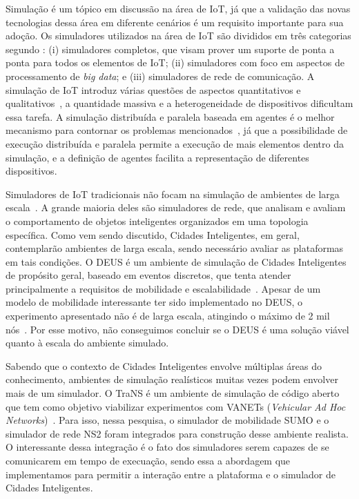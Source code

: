 Simulação é um tópico em discussão na área de IoT, já que a validação das novas tecnologias dessa área em diferente cenários é um requisito importante para sua adoção.
Os simuladores utilizados na área de IoT são divididos em três categorias segundo \cite{baig_2018}:
(i) simuladores completos, que visam prover um suporte de ponta a ponta para todos os elementos de IoT;
(ii) simuladores com foco em aspectos de processamento de \textit{big data};
e (iii) simuladores de rede de comunicação.
A simulação de IoT introduz várias questões de aspectos quantitativos e qualitativos~\citep{angelo_2016}, a quantidade massiva e a heterogeneidade de dispositivos dificultam essa tarefa.
A simulação distribuída e paralela baseada em agentes é o melhor mecanismo para contornar os problemas mencionados~\citep{angelo_2016}, já que a possibilidade de execução distribuída e paralela permite
a execução de mais elementos dentro da simulação, e a definição de agentes facilita a representação de diferentes dispositivos.

Simuladores de IoT tradicionais não focam na simulação de ambientes de larga escala~\citep{brambilla_2014}.
A grande maioria deles são simuladores de rede, que analisam e avaliam o comportamento de objetos inteligentes organizados em uma topologia específica.
Como vem sendo discutido, Cidades Inteligentes, em geral, contemplarão ambientes de larga escala, sendo necessário avaliar as plataformas em tais condições.
O DEUS é um ambiente de simulação de Cidades Inteligentes de propósito geral, baseado em eventos discretos, que tenta atender principalmente a requisitos de mobilidade e escalabilidade~\citep{picone_2012}.
Apesar de um modelo de mobilidade interessante ter sido implementado no DEUS, o experimento apresentado não é de larga escala, atingindo o máximo de 2 mil nós~\citep{picone_2012}.
Por esse motivo, não conseguimos concluir se o DEUS é uma solução viável quanto à escala do ambiente simulado.

Sabendo que o contexto de Cidades Inteligentes envolve múltiplas áreas do conhecimento, ambientes de simulação realísticos muitas vezes podem envolver mais de um simulador.
O TraNS é um ambiente de simulação de código aberto que tem como objetivo viabilizar experimentos com VANETs (\textit{Vehicular Ad Hoc Networks})~\citep{piorkowski_2008}.
Para isso, nessa pesquisa, o simulador de mobilidade SUMO e o simulador de rede NS2 foram integrados para construção desse ambiente realista.
O interessante dessa integração é o fato dos simuladores serem capazes de se comunicarem em tempo de execuação, sendo essa a abordagem que implementamos para permitir a interação entre a plataforma
e o simulador de Cidades Inteligentes.

